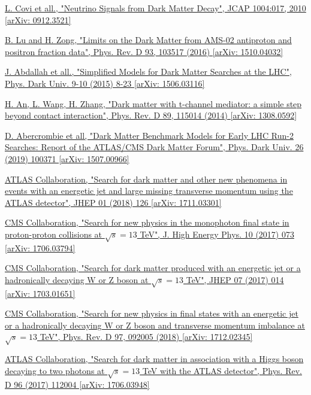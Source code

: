 \documentclass[a4paper, 10pt, openright]{report}
\begin{document}
\begin{thebibliography}{1}
\href{https://arxiv.org/abs/0912.3521}{L. Covi et all.,
"Neutrino Signals from Dark Matter Decay",
JCAP 1004:017, 2010 [arXiv: 0912.3521]
}

\href{https://arxiv.org/abs/1510.04032}{B. Lu and H. Zong,
"Limits on the Dark Matter from AMS-02 antiproton and positron fraction data",
Phys. Rev. D 93, 103517 (2016) [arXiv: 1510.04032]
}

\href{https://arxiv.org/abs/1506.03116}{J. Abdallah et all.,
"Simplified Models for Dark Matter Searches at the LHC",
Phys. Dark Univ. 9-10 (2015) 8-23 [arXiv: 1506.03116]
}

\href{https://arxiv.org/abs/1308.0592}{H. An, L. Wang, H. Zhang,
"Dark matter with t-channel mediator: a simple step beyond contact interaction",
Phys. Rev. D 89, 115014 (2014) [arXiv: 1308.0592]
}

\href{https://arxiv.org/abs/1507.00966}{D. Abercrombie et all,
"Dark Matter Benchmark Models for Early LHC Run-2 Searches: Report of the ATLAS/CMS Dark Matter Forum", Phys. Dark Univ. 26 (2019) 100371 [arXiv: 1507.00966]}

\href{https://arxiv.org/abs/1711.03301}{ATLAS Collaboration,
"Search for dark matter and other new phenomena in events with an energetic jet and large missing transverse momentum using the ATLAS detector",
JHEP 01 (2018) 126 [arXiv: 1711.03301]
}

\href{https://arxiv.org/abs/1706.03794}{CMS Collaboration,
"Search for new physics in the monophoton final state in proton-proton collisions at $\sqrt{s} = 13$ TeV",
J. High Energy Phys. 10 (2017) 073 [arXiv: 1706.03794]
}

\href{https://arxiv.org/abs/1703.01651}{CMS Collaboration,
"Search for dark matter produced with an energetic jet or a hadronically decaying W or Z boson at $\sqrt{s} = 13$ TeV",
JHEP 07 (2017) 014 [arXiv: 1703.01651]
}

\href{https://arxiv.org/abs/1712.02345}{CMS Collaboration,
"Search for new physics in final states with an energetic jet or a hadronically decaying W or Z boson and transverse momentum imbalance at $\sqrt{s} = 13$ TeV",
Phys. Rev. D 97, 092005 (2018) [arXiv: 1712.02345]
}

\href{https://arxiv.org/abs/1706.03948}{ATLAS Collaboration,
"Search for dark matter in association with a Higgs boson decaying to two photons at $\sqrt{s} = 13$ TeV with the ATLAS detector",
Phys. Rev. D 96 (2017) 112004 [arXiv: 1706.03948]
}


\end{thebibliography}
\end{document}
